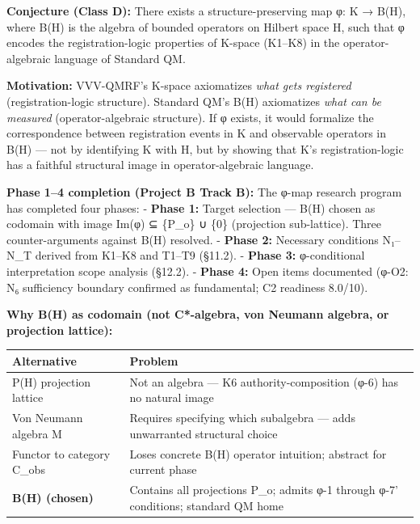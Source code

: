 \documentclass[
  11pt,
]{article}
\newcounter{none} %
\begin{document}
\textbf{Conjecture (Class D):} There exists a structure-preserving map
φ: K → B(H), where B(H) is the algebra of bounded operators on Hilbert
space H, such that φ encodes the registration-logic properties of
K-space (K1--K8) in the operator-algebraic language of Standard QM.

\textbf{Motivation:} VVV-QMRF's K-space axiomatizes \emph{what gets
registered} (registration-logic structure). Standard QM's B(H)
axiomatizes \emph{what can be measured} (operator-algebraic structure).
If φ exists, it would formalize the correspondence between registration
events in K and observable operators in B(H) --- not by identifying K
with H, but by showing that K's registration-logic has a faithful
structural image in operator-algebraic language.

\textbf{Phase 1--4 completion (Project B Track B):} The φ-map research
program has completed four phases: - \textbf{Phase 1:} Target selection
--- B(H) chosen as codomain with image Im(φ) ⊆ \{P\_o\} ∪ \{0\}
(projection sub-lattice). Three counter-arguments against B(H) resolved.
- \textbf{Phase 2:} Necessary conditions N₁--N\_T derived from K1--K8
and T1--T9 (§11.2). - \textbf{Phase 3:} φ-conditional interpretation
scope analysis (§12.2). - \textbf{Phase 4:} Open items documented (φ-O2:
N₆ sufficiency boundary confirmed as fundamental; C2 readiness 8.0/10).

\textbf{Why B(H) as codomain (not C*-algebra, von Neumann algebra, or
projection lattice):}

{\def\LTcaptype{none} %
\begin{longtable}[]{@{}
  >{\raggedright\arraybackslash}p{}
  >{\raggedright\arraybackslash}p{}@{}}
\toprule\noalign{}
\begin{minipage}[b]{\linewidth}\raggedright
Alternative
\end{minipage} & \begin{minipage}[b]{\linewidth}\raggedright
Problem
\end{minipage} \\
\midrule\noalign{}
\endhead
\bottomrule\noalign{}
\endlastfoot
P(H) projection lattice & Not an algebra --- K6 authority-composition
(φ-6) has no natural image \\
Von Neumann algebra M & Requires specifying which subalgebra --- adds
unwarranted structural choice \\
Functor to category C\_obs & Loses concrete B(H) operator intuition;
abstract for current phase \\
\textbf{B(H) (chosen)} & Contains all projections P\_o; admits φ-1
through φ-7' conditions; standard QM home \\
\end{longtable}
}
\end{document}
